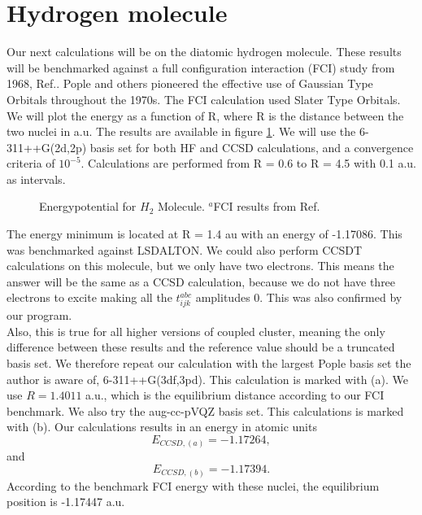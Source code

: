 \section{Hydrogen molecule}
Our next calculations will be on the diatomic hydrogen molecule. These
results will be benchmarked against a full configuration interaction (FCI) study from 1968,
Ref.\cite{fci_h2_molecule_stuff}. Pople and others pioneered the
effective use of Gaussian Type Orbitals throughout the 1970s. The FCI
calculation used Slater Type Orbitals. We will plot the energy as a
function of R, where R is the distance between the two nuclei in
a.u. The results are available in figure \ref{fig:h2poten}. We will
use the 6-311++G(2d,2p) basis set for both HF and CCSD calculations,
and a convergence criteria of $10^{-5}$. Calculations are performed
from R = 0.6 to R = 4.5 with 0.1 a.u. as intervals. \\
\begin{figure}[h!]
\begin{center}
\caption{Energypotential for $H_2$ Molecule. 
$^a$FCI results from Ref.\cite{fci_h2_molecule_stuff}}
\label{fig:h2poten}
\end{center}
\end{figure}

The energy minimum is located at R = 1.4 au with an energy of
-1.17086. This was benchmarked against LSDALTON. We could also perform
CCSDT calculations on this molecule, but we only have two
electrons. This means the answer will be the same as a CCSD
calculation, because we do not have three electrons to excite making
all the $t_{ijk}^{abc}$ amplitudes 0. This was also confirmed by our
program. \\

Also, this is true for all higher versions of coupled cluster, meaning
the only difference between these results and the reference value
should be a truncated basis set. We therefore repeat our calculation
with the largest Pople basis set the author is aware of,
6-311++G(3df,3pd). This calculation is marked with (a). We use $R =
1.4011$ a.u., which is the equilibrium distance according to our FCI
benchmark. We also try the aug-cc-pVQZ basis set. This calculations is
marked with (b). Our calculations results in an energy in atomic
units
\begin{equation}
E_{CCSD,(a)} = -1.17264,
\end{equation}
and
\begin{equation}
E_{CCSD,(b)} = -1.17394.
\end{equation}
According to the benchmark FCI energy with these nuclei, the equilibrium  position is -1.17447 a.u. \\

